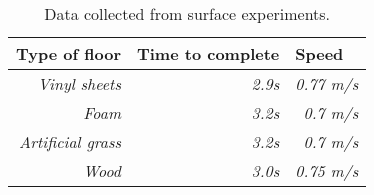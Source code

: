 \begin{table}[H]
\def\arraystretch{1.2}
\centering
\begin{tabular}{|r|r|r|}
\hline
\multicolumn{1}{|l|}{\textbf{Type of floor}} & \multicolumn{1}{l|}{\textbf{Time to complete}} & \multicolumn{1}{l|}{\textbf{Speed}} \\ \hline
\textit{Vinyl sheets}                    & \textit{2.9s}                                  & \textit{0.77 m/s}                   \\ \hline
\textit{Foam}                                & \textit{3.2s}                                  & \textit{0.7 m/s}                    \\ \hline
\textit{Artificial grass}                    & \textit{3.2s}                                  & \textit{0.7 m/s}                    \\ \hline
\textit{Wood}                                & \textit{3.0s}                                  & \textit{0.75 m/s}                   \\ \hline
\end{tabular}
\caption{Data collected from surface experiments.}
\label{table:SurfaceTable}
\end{table}